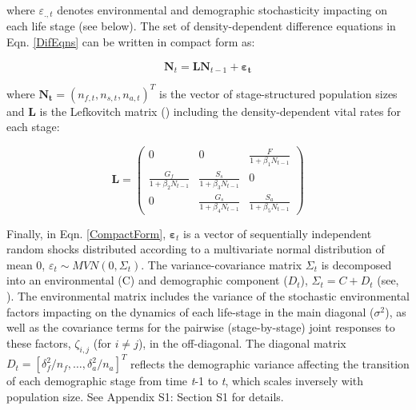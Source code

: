\documentclass[12pt]{article}
\begin{document}
where $\varepsilon_{.,t}$ denotes environmental and demographic stochasticity impacting on each life stage (see below). The set of density-dependent difference equations in Eqn. \ref{DifEqns} can be written in compact form as:

\begin{equation}\label{CompactForm}
	\mathbf{N}_{t}=\mathbf{L} \mathbf{N}_{t-1} + \boldsymbol{\varepsilon_{t}}
\end{equation}

where $\mathbf{N_{t}} = (n_{f,t}, n_{s,t}, n_{a,t})^T$ is the vector of stage-structured population sizes and $\mathbf{L}$ is the Lefkovitch matrix (\cite{Lefkovitch1965}) including the density-dependent vital rates for each stage:

\begin{equation}\label{DDLefkovitchMatrix}
	\mathbf{L}=\left(\begin{array}{ccc}{0} & {0} & {\frac{F}{1+\beta_{1} N_{ t-1}}} \\
		{\frac{G_{f}}{1+\beta_{2} N_{ t-1}}} & {\frac{S_{s}}{1+\beta_{3} N_{ t-1}}} & {0} \\
		{0} & {\frac{G_{s}}{1+\beta_{4} N_{ t-1}}} & {\frac{S_{a}}{1+\beta_{5} N_{ t-1}}}\end{array}\right)
\end{equation}


Finally, in Eqn. \ref{CompactForm}, $\boldsymbol\varepsilon_{t}$ is a vector of sequentially independent random shocks distributed according to a multivariate normal distribution of mean 0, $\varepsilon_{t} \sim MVN(0, \Sigma_{t})$. The variance-covariance matrix $\Sigma_{t}$ is decomposed into an environmental (C) and demographic component ($D_{t}$), $\Sigma_{t} = C + D_{t}$ (see, \cite{Mutshinda2011,Almaraz2011}). The environmental matrix includes the variance of the stochastic environmental factors impacting on the dynamics of each life-stage in the main diagonal ($\sigma^2$), as well as the covariance terms for the pairwise (stage-by-stage) joint responses to these factors, $\zeta_{i,j}$ (for $i \neq j$), in the off-diagonal. The diagonal matrix $D_{t} = [\delta_{f}^2/n_{f},\ldots, \delta_{a}^2/n_{a}]^T$ reflects the demographic variance affecting the transition of each demographic stage from time \textit{t}-1 to \textit{t}, which scales inversely with population size. See Appendix S1: Section S1 for details.\\
\end{document}
